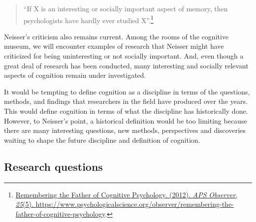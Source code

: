 \documentclass[
  oneside,
  12pt]{crumpbook}
\begin{document}
\begin{quote}
``If X is an interesting or socially important aspect of memory, then psychologists have hardly ever studied X''.\footnote{\protect\hyperlink{ref-RememberingFatherCognitive2012}{Remembering the {Father} of {Cognitive Psychology}. (2012). \emph{APS Observer}, \emph{25}(5). \url{https://www.psychologicalscience.org/observer/remembering-the-father-of-cognitive-psychology}}.}
\end{quote}

Neisser's criticism also remains current. Among the rooms of the cognitive museum, we will encounter examples of research that Neisser might have criticized for being uninteresting or not socially important. And, even though a great deal of research has been conducted, many interesting and socially relevant aspects of cognition remain under investigated.

It would be tempting to define cognition as a discipline in terms of the questions, methods, and findings that researchers in the field have produced over the years. This would define cognition in terms of what the discipline has historically done. However, to Neisser's point, a historical definition would be too limiting because there are many interesting questions, new methods, perspectives and discoveries waiting to shape the future discipline and definition of cognition.

\hypertarget{research-questions}{%
\subsection{Research questions}\label{research-questions}}
\end{document}
